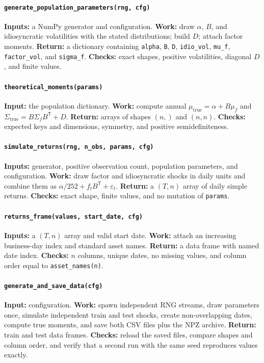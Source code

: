 \documentclass[10pt]{article}
\newcommand{\trans}{^{\mathsf T}}
\begin{document}
\begin{sloppypar}
\paragraph{\texttt{generate\_population\_parameters(rng, cfg)}}
\textbf{Inputs:} a NumPy generator and configuration.
\textbf{Work:} draw $\alpha$, $B$, and idiosyncratic volatilities with the
stated distributions; build $D$; attach factor moments.
\textbf{Return:} a dictionary containing
\texttt{alpha}, \texttt{B}, \texttt{D}, \texttt{idio\_vol},
\texttt{mu\_f}, \texttt{factor\_vol}, and \texttt{sigma\_f}.
\textbf{Checks:} exact shapes, positive volatilities, diagonal $D$, and finite
values.

\paragraph{\texttt{theoretical\_moments(params)}}
\textbf{Input:} the population dictionary.
\textbf{Work:} compute annual
$\mu_{\mathrm{true}}=\alpha+B\mu_f$ and
$\Sigma_{\mathrm{true}}=B\Sigma_fB\trans+D$.
\textbf{Return:} arrays of shapes $(n,)$ and $(n,n)$.
\textbf{Checks:} expected keys and dimensions, symmetry, and positive
semidefiniteness.

\paragraph{\texttt{simulate\_returns(rng, n\_obs, params, cfg)}}
\textbf{Inputs:} generator, positive observation count, population parameters,
and configuration. \textbf{Work:} draw factor and idiosyncratic shocks in daily
units and combine them as
$\alpha/252+f_tB\trans+\varepsilon_t$.
\textbf{Return:} a $(T,n)$ array of daily simple returns.
\textbf{Checks:} exact shape, finite values, and no mutation of
\texttt{params}.

\paragraph{\texttt{returns\_frame(values, start\_date, cfg)}}
\textbf{Inputs:} a $(T,n)$ array and valid start date.
\textbf{Work:} attach an increasing business-day index and standard asset
names. \textbf{Return:} a data frame with named date index.
\textbf{Checks:} $n$ columns, unique dates, no missing values, and column order
equal to \texttt{asset\_names(n)}.

\paragraph{\texttt{generate\_and\_save\_data(cfg)}}
\textbf{Input:} configuration. \textbf{Work:} spawn independent RNG streams,
draw parameters once, simulate independent train and test shocks, create
non-overlapping dates, compute true moments, and save both CSV files plus the
NPZ archive. \textbf{Return:} train and test data frames.
\textbf{Checks:} reload the saved files, compare shapes and column order, and
verify that a second run with the same seed reproduces values exactly.


\end{sloppypar}
\end{document}

